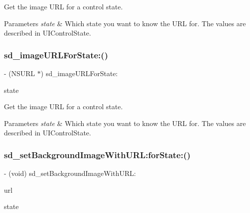 Get the image U\+RL for a control state.


\begin{DoxyParams}{Parameters}
{\em state} & Which state you want to know the U\+RL for. The values are described in U\+I\+Control\+State. \\
\hline
\end{DoxyParams}
\mbox{\label{category_u_i_button_07_web_cache_08_a980c6b65dd457fcf4498763dd3e79ff0}} 
\subsubsection{\texorpdfstring{sd\+\_\+image\+U\+R\+L\+For\+State\+:()}{sd\_imageURLForState:()}\hspace{0.1cm}{\footnotesize\ttfamily [3/3]}}
{\footnotesize\ttfamily -\/ (N\+S\+U\+RL $\ast$) sd\+\_\+image\+U\+R\+L\+For\+State\+: \begin{DoxyParamCaption}\item[{(U\+I\+Control\+State)}]{state }\end{DoxyParamCaption}}

Get the image U\+RL for a control state.


\begin{DoxyParams}{Parameters}
{\em state} & Which state you want to know the U\+RL for. The values are described in U\+I\+Control\+State. \\
\hline
\end{DoxyParams}
\mbox{\label{category_u_i_button_07_web_cache_08_a089b2c745708bd54f980521be6755d59}} 
\subsubsection{\texorpdfstring{sd\+\_\+set\+Background\+Image\+With\+U\+R\+L\+:for\+State\+:()}{sd\_setBackgroundImageWithURL:forState:()}\hspace{0.1cm}{\footnotesize\ttfamily [1/3]}}
{\footnotesize\ttfamily -\/ (void) sd\+\_\+set\+Background\+Image\+With\+U\+R\+L\+: \begin{DoxyParamCaption}\item[{(N\+S\+U\+RL $\ast$)}]{url }\item[{forState:(U\+I\+Control\+State)}]{state }\end{DoxyParamCaption}}

